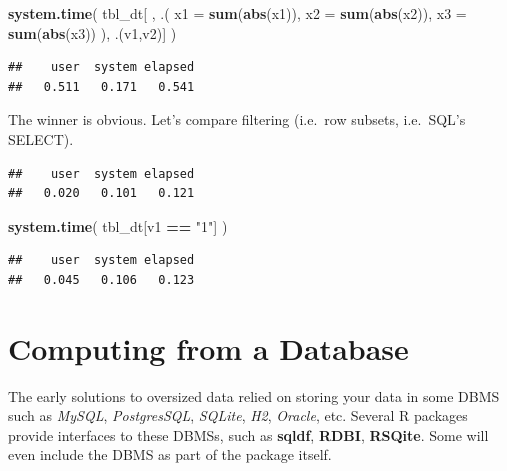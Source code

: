 \documentclass[]{book}
\newenvironment{Shaded}{\begin{snugshade}}{\end{snugshade}}
\newcommand{\DataTypeTok}[1]{\textcolor[rgb]{0.13,0.29,0.53}{#1}}
\newcommand{\KeywordTok}[1]{\textcolor[rgb]{0.13,0.29,0.53}{\textbf{#1}}}
\newcommand{\NormalTok}[1]{#1}
\newcommand{\OperatorTok}[1]{\textcolor[rgb]{0.81,0.36,0.00}{\textbf{#1}}}
\newcommand{\StringTok}[1]{\textcolor[rgb]{0.31,0.60,0.02}{#1}}
\theoremstyle{definition}
\theoremstyle{definition}
\theoremstyle{definition}
\theoremstyle{remark}
\begin{document}
\begin{Shaded}
\begin{Highlighting}[]
\KeywordTok{system.time}\NormalTok{( }
\NormalTok{  tbl_dt[ ,  .( }\DataTypeTok{x1 =} \KeywordTok{sum}\NormalTok{(}\KeywordTok{abs}\NormalTok{(x1)), }\DataTypeTok{x2 =} \KeywordTok{sum}\NormalTok{(}\KeywordTok{abs}\NormalTok{(x2)), }\DataTypeTok{x3 =} \KeywordTok{sum}\NormalTok{(}\KeywordTok{abs}\NormalTok{(x3)) ), .(v1,v2)]}
\NormalTok{  )}
\end{Highlighting}
\end{Shaded}

\begin{verbatim}
##    user  system elapsed 
##   0.511   0.171   0.541
\end{verbatim}

The winner is obvious.
Let's compare filtering (i.e.~row subsets, i.e.~SQL's SELECT).

\begin{Shaded}
\end{Shaded}

\begin{verbatim}
##    user  system elapsed 
##   0.020   0.101   0.121
\end{verbatim}

\begin{Shaded}
\begin{Highlighting}[]
\KeywordTok{system.time}\NormalTok{( }
\NormalTok{  tbl_dt[v1 }\OperatorTok{==}\StringTok{ "1"}\NormalTok{] }
\NormalTok{  )}
\end{Highlighting}
\end{Shaded}

\begin{verbatim}
##    user  system elapsed 
##   0.045   0.106   0.123
\end{verbatim}

\hypertarget{computing-from-a-database}{%
\section{Computing from a Database}\label{computing-from-a-database}}

The early solutions to oversized data relied on storing your data in some DBMS such as \emph{MySQL}, \emph{PostgresSQL}, \emph{SQLite}, \emph{H2}, \emph{Oracle}, etc.
Several R packages provide interfaces to these DBMSs, such as \textbf{sqldf}, \textbf{RDBI}, \textbf{RSQite}.
Some will even include the DBMS as part of the package itself.
\end{document}
